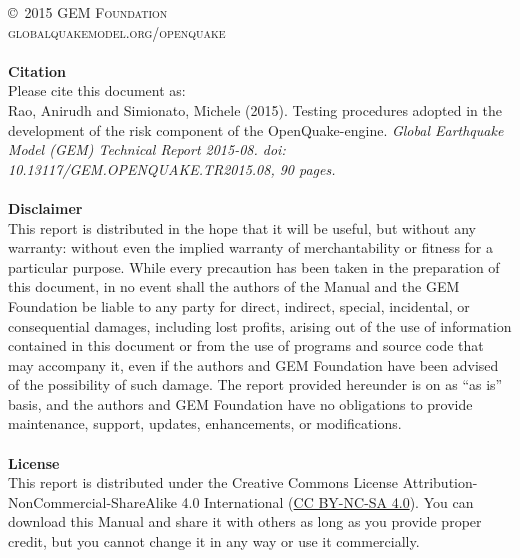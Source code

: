 \documentclass[11pt,fleqn]{book} %
\begin{document}
\noindent \copyright\ \textsc{2015 GEM Foundation}\\ %
\noindent \textsc{globalquakemodel.org/openquake}\\ %
\noindent \hfill\\
\noindent
   {\textbf{Citation}} \hfill \\
   Please cite this document as: \hfill \\
   Rao, Anirudh and Simionato, Michele (2015). 
   Testing procedures adopted in the development of the risk 
   component of the OpenQuake-engine. 
   \textit{Global Earthquake Model (GEM) Technical Report 2015-08. 
   doi: 10.13117/GEM.OPENQUAKE.TR2015.08, 90 pages.} \hfill \\
\noindent \hfill\\
\noindent
   {\bf{Disclaimer}} \hfill \\
   This report is distributed in the hope that it will be 
   useful, but without any warranty: without even the implied warranty of 
   merchantability or fitness for a particular purpose. While every precaution 
   has been taken in the preparation of this document, in no event shall the 
   authors of the Manual and the GEM Foundation be liable to any party for 
   direct, indirect, special, incidental, or consequential damages, including 
   lost profits, arising out of the use of information contained in this 
   document or from the use of programs and source code that may accompany it, 
   even if the authors and GEM Foundation have been advised of the possibility 
   of such damage. The report provided hereunder is on as ``as is'' basis, and the 
   authors and GEM Foundation have no obligations to provide maintenance, 
   support, updates, enhancements, or modifications. \hfill \\
\noindent \hfill\\
\noindent
   {\bf{License}} \hfill \\
   This report is distributed under the Creative Commons License 
   Attribution-NonCommercial-ShareAlike 4.0 International 
   (\href{http://creativecommons.org/licenses/by-nc-sa/4.0/}
   {CC BY-NC-SA 4.0}). 
   You can download this Manual and share it with 
   others as long as you provide proper credit, but you cannot change 
   it in any way or use it commercially.\hfill \\
\end{document}
